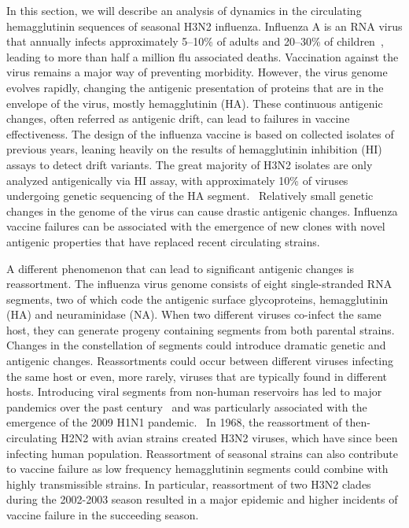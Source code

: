 \documentclass[a4paper,11pt]{article}
\begin{document}
In this section, we will describe an analysis of dynamics in the
circulating hemagglutinin sequences of seasonal H3N2 influenza.
Influenza A is an RNA virus that annually infects approximately
5--10\% of adults and 20--30\% of children~\cite{WHO}, leading to more
than half a million flu associated deaths.
Vaccination against the virus remains a major way of preventing morbidity.
However, the virus genome evolves rapidly, changing the antigenic presentation of proteins that are in the envelope of the virus, mostly hemagglutinin (HA).
These continuous antigenic changes, often referred as antigenic drift, can lead to failures in vaccine effectiveness.
The design of the influenza vaccine is based on collected isolates of previous years, leaning heavily on the results of hemagglutinin inhibition (HI) assays to detect drift variants.
The great majority of H3N2 isolates are only analyzed antigenically via HI assay, with approximately 10\% of viruses undergoing genetic sequencing of the HA segment.~\cite{russell2008influenza}
Relatively small genetic changes in the genome of the virus can cause drastic antigenic changes.
Influenza vaccine failures can be associated with the emergence of new
clones with novel antigenic properties that have replaced recent
circulating strains.

A different phenomenon that can lead to significant antigenic changes is reassortment.
The influenza virus genome consists of eight single-stranded RNA segments, two of which code the antigenic surface glycoproteins, hemagglutinin (HA) and neuraminidase (NA).
When two different viruses co-infect the same host, they can generate  progeny containing segments from both parental strains.
Changes in the constellation of segments could introduce dramatic genetic and antigenic changes.
Reassortments could occur between different viruses infecting the same host or even, more rarely, viruses that are typically found in different hosts.
Introducing viral segments from non-human reservoirs has led to major pandemics over the past century~\cite{rabadan2007evolution, rabadan2008non} and was particularly associated with the emergence of the 2009 H1N1 pandemic.~\cite{trifonov2009geographic, solovyov2009cluster}
In 1968, the reassortment of then-circulating H2N2 with avian strains created H3N2 viruses, which have since been infecting human population.
Reassortment of seasonal strains can also contribute to vaccine failure as low frequency hemagglutinin segments could combine with highly transmissible strains.
In particular, reassortment of two H3N2 clades during the 2002-2003 season resulted in a major epidemic and higher incidents of vaccine failure in the succeeding season.~\cite{centers2004preliminary}
\end{document}
